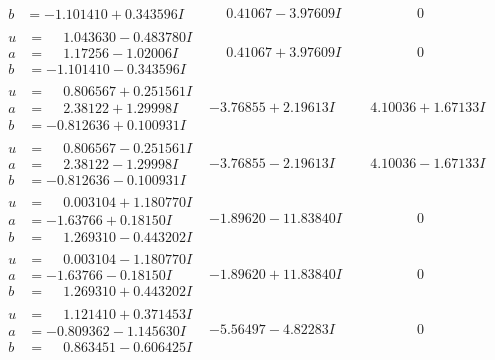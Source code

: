 \documentclass[1p]{elsarticle_modified}
\theoremstyle{definition}
\begin{document}
$$\begin{array}{c|c|c}
\begin{aligned}
b &= -1.101410 + 0.343596 I\end{aligned}
 & \phantom{-}0.41067 - 3.97609 I & \phantom{-0.000000 } 0 \\ \hline\begin{aligned}
u &= \phantom{-}1.043630 - 0.483780 I \\
a &= \phantom{-}1.17256 - 1.02006 I \\
b &= -1.101410 - 0.343596 I\end{aligned}
 & \phantom{-}0.41067 + 3.97609 I & \phantom{-0.000000 } 0 \\ \hline\begin{aligned}
u &= \phantom{-}0.806567 + 0.251561 I \\
a &= \phantom{-}2.38122 + 1.29998 I \\
b &= -0.812636 + 0.100931 I\end{aligned}
 & -3.76855 + 2.19613 I & \phantom{-}4.10036 + 1.67133 I \\ \hline\begin{aligned}
u &= \phantom{-}0.806567 - 0.251561 I \\
a &= \phantom{-}2.38122 - 1.29998 I \\
b &= -0.812636 - 0.100931 I\end{aligned}
 & -3.76855 - 2.19613 I & \phantom{-}4.10036 - 1.67133 I \\ \hline\begin{aligned}
u &= \phantom{-}0.003104 + 1.180770 I \\
a &= -1.63766 + 0.18150 I \\
b &= \phantom{-}1.269310 - 0.443202 I\end{aligned}
 & -1.89620 - 11.83840 I & \phantom{-0.000000 } 0 \\ \hline\begin{aligned}
u &= \phantom{-}0.003104 - 1.180770 I \\
a &= -1.63766 - 0.18150 I \\
b &= \phantom{-}1.269310 + 0.443202 I\end{aligned}
 & -1.89620 + 11.83840 I & \phantom{-0.000000 } 0 \\ \hline\begin{aligned}
u &= \phantom{-}1.121410 + 0.371453 I \\
a &= -0.809362 - 1.145630 I \\
b &= \phantom{-}0.863451 - 0.606425 I\end{aligned}
 & -5.56497 - 4.82283 I & \phantom{-0.000000 } 0 \\ \hline\begin{aligned}

\end{aligned}
\end{array}$$
\end{document}
